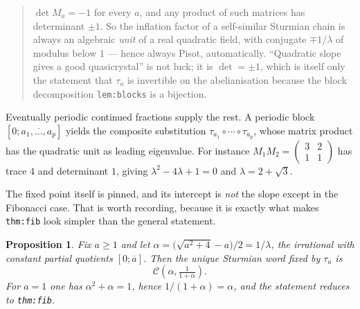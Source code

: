 \documentclass[11pt,a4paper]{article}
\newcommand{\C}{\mathcal{C}}
\theoremstyle{definition}
\theoremstyle{plain}
\newtheorem{proposition}[definition]{Proposition}
\begin{document}
\begin{quote}
$\det M_a = -1$ for every $a$, and any product of such matrices has determinant
$\pm 1$. So the inflation factor of a self-similar Sturmian chain is always an
algebraic \emph{unit} of a real quadratic field, with conjugate $\mp 1/\lambda$
of modulus below $1$ --- hence always Pisot, automatically. ``Quadratic slope
gives a good quasicrystal'' is not luck; it is $\det = \pm 1$, which is itself
only the statement that $\tau_a$ is invertible on the abelianisation because the
block decomposition \texttt{lem:blocks} is a bijection.
\end{quote}

Eventually periodic continued fractions supply the rest. A periodic block
$[0;\overline{a_1,\dots,a_p}]$ yields the composite substitution
$\tau_{a_1} \circ \cdots \circ \tau_{a_p}$, whose matrix product has the
quadratic unit as leading eigenvalue. For instance
$M_1 M_2 = \left(\begin{smallmatrix}3&2\\1&1\end{smallmatrix}\right)$ has trace
$4$ and determinant $1$, giving $\lambda^2 - 4\lambda + 1 = 0$ and
$\lambda = 2+\sqrt 3$.

The fixed point itself is pinned, and its intercept is \emph{not} the slope
except in the Fibonacci case. That is worth recording, because it is exactly
what makes \texttt{thm:fib} look simpler than the general statement.

\begin{proposition}\label{prop:metallic}
Fix $a \geq 1$ and let $\alpha = \bigl(\sqrt{a^2+4} - a\bigr)/2 = 1/\lambda$,
the irrational with constant partial quotients $[0;\overline{a}]$. Then the
unique Sturmian word fixed by $\tau_a$ is
\[
  \C\!\left(\alpha, \tfrac{1}{1+\alpha}\right) .
\]
For $a = 1$ one has $\alpha^2 + \alpha = 1$, hence $1/(1+\alpha) = \alpha$, and
the statement reduces to \texttt{thm:fib}.
\end{proposition}
\end{document}

